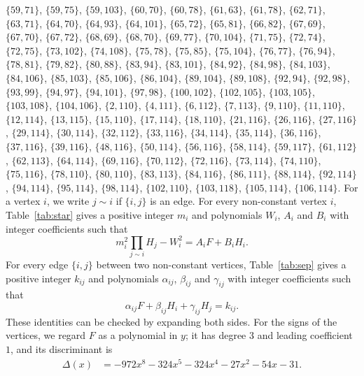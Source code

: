 \documentclass[11pt]{article}
\begin{document}
$\{59,71\}$, $\{59,75\}$, $\{59,103\}$, $\{60,70\}$, $\{60,78\}$, $\{61,63\}$, $\{61,78\}$, $\{62,71\}$, $\{63,71\}$, $\{64,70\}$, $\{64,93\}$, $\{64,101\}$, $\{65,72\}$, $\{65,81\}$, $\{66,82\}$, $\{67,69\}$, $\{67,70\}$, $\{67,72\}$, $\{68,69\}$, $\{68,70\}$, $\{69,77\}$, $\{70,104\}$, $\{71,75\}$, $\{72,74\}$, $\{72,75\}$, $\{73,102\}$, $\{74,108\}$, $\{75,78\}$, $\{75,85\}$, $\{75,104\}$, $\{76,77\}$, $\{76,94\}$, $\{78,81\}$, $\{79,82\}$, $\{80,88\}$, $\{83,94\}$, $\{83,101\}$, $\{84,92\}$, $\{84,98\}$, $\{84,103\}$, $\{84,106\}$, $\{85,103\}$, $\{85,106\}$, $\{86,104\}$, $\{89,104\}$, $\{89,108\}$, $\{92,94\}$, $\{92,98\}$, $\{93,99\}$, $\{94,97\}$, $\{94,101\}$, $\{97,98\}$, $\{100,102\}$, $\{102,105\}$, $\{103,105\}$, $\{103,108\}$, $\{104,106\}$, $\{2,110\}$, $\{4,111\}$, $\{6,112\}$, $\{7,113\}$, $\{9,110\}$, $\{11,110\}$, $\{12,114\}$, $\{13,115\}$, $\{15,110\}$, $\{17,114\}$, $\{18,110\}$, $\{21,116\}$, $\{26,116\}$, $\{27,116\}$, $\{29,114\}$, $\{30,114\}$, $\{32,112\}$, $\{33,116\}$, $\{34,114\}$, $\{35,114\}$, $\{36,116\}$, $\{37,116\}$, $\{39,116\}$, $\{48,116\}$, $\{50,114\}$, $\{56,116\}$, $\{58,114\}$, $\{59,117\}$, $\{61,112\}$, $\{62,113\}$, $\{64,114\}$, $\{69,116\}$, $\{70,112\}$, $\{72,116\}$, $\{73,114\}$, $\{74,110\}$, $\{75,116\}$, $\{78,110\}$, $\{80,110\}$, $\{83,113\}$, $\{84,116\}$, $\{86,111\}$, $\{88,114\}$, $\{92,114\}$, $\{94,114\}$, $\{95,114\}$, $\{98,114\}$, $\{102,110\}$, $\{103,118\}$, $\{105,114\}$, $\{106,114\}$. For a vertex $i$, we write $j\sim i$ if $\{i,j\}$ is an edge.
For every non-constant vertex $i$, Table~\ref{tab:star} gives a positive integer $m_{i}$ and polynomials $W_{i}$, $A_{i}$ and $B_{i}$ with integer coefficients such that
\begin{equation}\label{eq:star}
m_i^2\prod_{j\sim i}H_j-W_i^2=A_iF+B_iH_i.
\end{equation}
For every edge $\{i,j\}$ between two non-constant vertices, Table~\ref{tab:sep} gives a positive integer $k_{ij}$ and polynomials $\alpha_{ij}$, $\beta_{ij}$ and $\gamma_{ij}$ with integer coefficients such that
\begin{equation}\label{eq:sep}
\alpha_{ij}F+\beta_{ij}H_i+\gamma_{ij}H_j=k_{ij}.
\end{equation}
These identities can be checked by expanding both sides.
For the signs of the vertices, we regard $F$ as a polynomial in $y$; it has degree $3$ and leading coefficient $1$, and its discriminant is
\begin{align*}
\Delta(x)&=-972x^{8}-324x^{5}-324x^{4}-27x^{2}-54x-31.
\end{align*}
\end{document}
